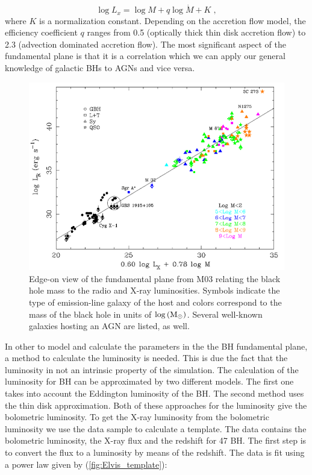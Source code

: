 \begin{equation}
\log L_{x}=\log M+q\log\dot{M}+K\;,\label{eq:LxFP}
\end{equation}
where $K$ is a normalization constant. Depending on the accretion
flow model, the efficiency coefficient $q$ ranges from 0.5 (optically
thick thin disk accretion flow) to 2.3 (advection dominated accretion
flow). The most significant aspect of the fundamental plane is that
it is a correlation which we can apply our general knowledge of galactic
BHs to AGNs and vice versa.

\begin{figure}
\centering{}\includegraphics[clip,scale=0.35]{Figures/FP} \protect\caption{\label{fig:Fp}Edge-on view of the fundamental plane from M03 relating
the black hole mass to the radio and X-ray luminosities. Symbols indicate
the type of emission-line galaxy of the host and colors correspond
to the mass of the black hole in units of $\log\left({\rm M}_{\odot}\right)$.
Several well-known galaxies hosting an AGN are listed, as well.}
\end{figure}

In other to model and calculate the parameters in the the BH fundamental plane, a method to calculate the luminosity is needed.  This is due the fact that the luminosity in not an intrinsic property of the simulation. The calculation of the luminosity for BH can be approximated by two different models. The first one takes into account the Eddington luminosity of the BH. The second method uses the thin disk approximation. Both of these approaches for the luminosity give the bolometric luminosity. To get the X-ray luminosity from the bolometric luminosity we use the \citet{elvis1994atlasof} data sample to calculate a template.  The data contains the bolometric luminosity, the X-ray flux and the redshift for 47 BH.  The first step is to convert the flux to a luminosity by means of the redshift. The data is fit using a power law given by (\ref{fig:Elvis_template}):

